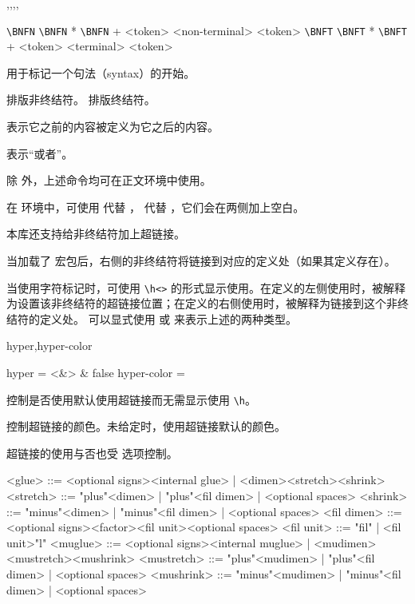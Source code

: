 \documentclass{cusdoc}
\begin{document}
\begin{function}{\BNFItem,\BNFN,\BNFI,\BNFO,\BNFT}
  \begin{syntax}
    \verb|\BNFN|   
    \verb|\BNFN| * 
    \verb|\BNFN| + <token> <{non-terminal}> <token>
    \verb|\BNFT|   
    \verb|\BNFT| * 
    \verb|\BNFT| + <token> <{terminal}> <token>
  \end{syntax}
 用于标记一个句法（syntax）的开始。

 排版非终结符。 排版终结符。

 表示它之前的内容被定义为它之后的内容。

 表示“或者”。

除  外，上述命令均可在正文环境中使用。

在  环境中，可使用  代替 ， 代替 ，它们会在两侧加上空白。
\end{function}

本库还支持给非终结符加上超链接。

当加载了  宏包后，右侧的非终结符将链接到对应的定义处（如果其定义存在）。

当使用字符标记时，可使用 \verb|\h<|\verb|>| 的形式显示使用。在定义的左侧使用时，被解释为设置该非终结符的超链接位置；在定义的右侧使用时，被解释为链接到这个非终结符的定义处。
可以显式使用  或  来表示上述的两种类型。

\begin{keyval}[path=texbnf]{hyper,hyper-color}
  \begin{syntax}
    hyper = <&\TTF> & false 
    hyper-color = 
  \end{syntax}
 控制是否使用默认使用超链接而无需显示使用 \verb|\h|。

 控制超链接的颜色。未给定时，使用超链接默认的颜色。

 超链接的使用与否也受  选项控制。
\end{keyval}


\begin{xample}[language={[BNF]{TeX}}]
\begin{latexbnf}[hyper, hyper-color=purple]
<glue> ::= <optional signs><internal glue>
  | <dimen><stretch><shrink>
<stretch> ::= "plus"<dimen> | "plus"<fil dimen> | <optional spaces>
<shrink> ::= "minus"<dimen> | "minus"<fil dimen> | <optional spaces>
<fil dimen> ::= <optional signs><factor><fil unit><optional spaces>
<fil unit> ::= "fil" | <fil unit>"l"
<muglue> ::= <optional signs><internal muglue>
  | <mudimen><mustretch><mushrink>
<mustretch> ::= "plus"<mudimen> | "plus"<fil dimen> | <optional spaces>
<mushrink> ::= "minus"<mudimen> | "minus"<fil dimen> | <optional spaces>
\end{latexbnf}
\stopxamplecode
\xamplecode
\xampleline\par\nointerlineskip\par
\xampletext
\end{xample}
\end{document}
